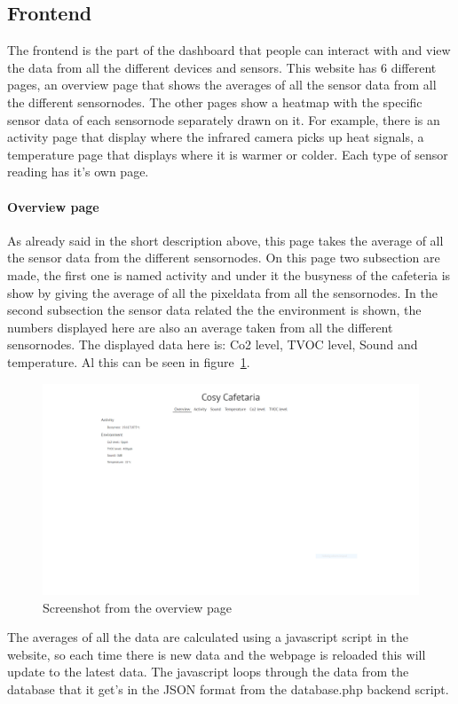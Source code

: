 \documentclass[11pt,a4paper]{article}
\begin{document}
\subsection{Frontend}
The frontend is the part of the dashboard that people can interact with and view the data from all the different devices and sensors.
This website has 6 different pages, an overview page that shows the averages of all the sensor data from all the different sensornodes.
The other pages show a heatmap with the specific sensor data of each sensornode separately drawn on it. 
For example, there is an activity page that display where the infrared camera picks up heat signals, a temperature page that displays where it is warmer or colder.
Each type of sensor reading has it's own page.

\paragraph{Overview page}
As already said in the short description above, this page takes the average of all the sensor data from the different sensornodes. 
On this page two subsection are made, the first one is named activity and under it the busyness of the cafeteria is show by giving the average of all the pixeldata from all the sensornodes.
In the second subsection the sensor data related the the environment is shown, the numbers displayed here are also an average taken from all the different sensornodes. 
The displayed data here is: Co2 level, TVOC level, Sound and temperature. Al this can be seen in figure~\ref{fig:overview_page}. 
\begin{figure}[H]
	\centering
	\includegraphics[width=1.0\linewidth]{overviewPage.png}
	\caption{Screenshot from the overview page}
	\label{fig:overview_page}
\end{figure}
The averages of all the data are calculated using a javascript script in the website, so each time there is new data and the webpage is reloaded this will update to the latest data.
The javascript loops through the data from the database that it get's in the JSON format from the database.php backend script.
\end{document}
